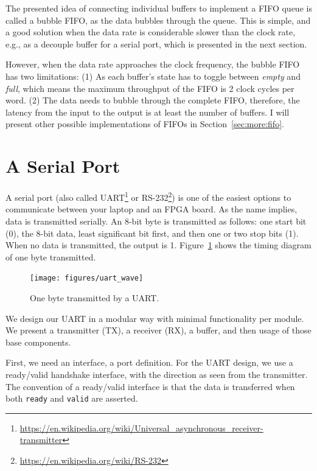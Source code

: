 \documentclass[%
    10pt,
    headinclude, footexclude,
    openright, %
    notitlepage,
    cleardoubleempty,
    headsepline,
    pointlessnumbers,
    bibtotoc, idxtotoc,
    ]{scrbook}
\newcommand{\code}[1]{{\small{\texttt{#1}}}}
\newcommand{\myref}[2]{\href{#1}{#2}}
\renewcommand{\myref}[2]{{#2}{\footnote{\url{#1}}}}
\begin{document}
{

The presented idea of connecting individual buffers to implement a FIFO
queue is called a bubble FIFO, as the data bubbles through the queue.
This is simple, and a good solution when the data rate is considerable slower
than the clock rate, e.g., as a decouple buffer for a serial port, which is presented
in the next section.

However, when the data rate approaches the clock frequency, the bubble FIFO
has two limitations: (1) As each buffer's state has to toggle between \emph{empty} and
\emph{full}, which means the maximum throughput of the FIFO is 2 clock cycles
per word. (2) The data needs to bubble through the complete FIFO, therefore,
the latency from the input to the output is at least the number of buffers.
I will present other possible implementations of FIFOs in Section~\ref{sec:more:fifo}.

\section{A Serial Port}

A serial port (also called
\myref{https://en.wikipedia.org/wiki/Universal_asynchronous_receiver-transmitter}{UART}
or \myref{https://en.wikipedia.org/wiki/RS-232}{RS-232}) is one of the easiest options
to communicate between your laptop and an FPGA board.
As the name implies, data is transmitted serially. An 8-bit byte is transmitted as follows:
one start bit (0), the 8-bit data, least significant bit first, and then one or two stop
bits (1). When no data is transmitted, the output is 1.
Figure~\ref{fig:uart:wave} shows the timing diagram of one byte transmitted.

\begin{figure}
  \centering
  \texttt{[image: figures/uart\_wave]}
  \caption{One byte transmitted by a UART.}
  \label{fig:uart:wave}
\end{figure}

We design our UART in a modular way with minimal functionality
per module. We present a transmitter (TX), a receiver (RX),
a buffer, and then usage of those base components.

First, we need an interface, a port definition.
For the UART design, we use a ready/valid handshake interface,
with the direction as seen from the transmitter.
The convention of a ready/valid interface is that the data is transferred
when both \code{ready} and \code{valid} are asserted.

}
\end{document}

